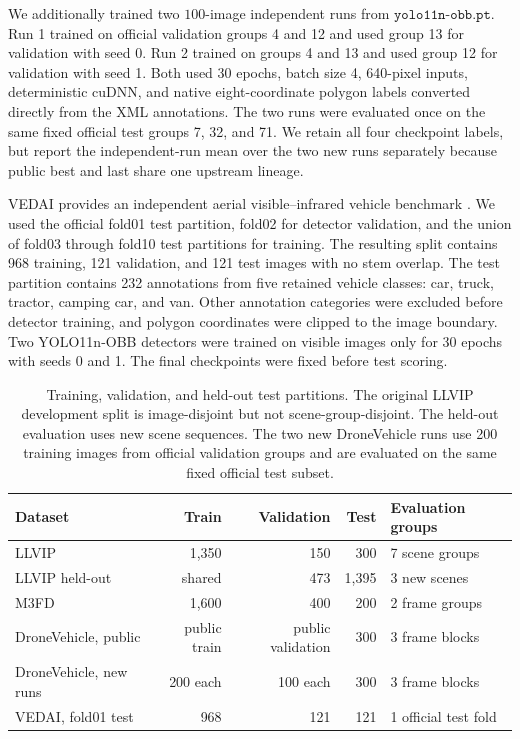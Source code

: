 \documentclass[preprint,11pt]{elsarticle}
\begin{document}
We additionally trained two \(100\)-image independent runs from
\(\texttt{yolo11n-obb.pt}\). Run 1 trained on official validation groups 4 and
12 and used group 13 for validation with seed 0. Run 2 trained on groups 4 and
13 and used group 12 for validation with seed 1. Both used 30 epochs, batch
size 4, 640-pixel inputs, deterministic cuDNN, and native eight-coordinate
polygon labels converted directly from the XML annotations. The two runs were
evaluated once on the same fixed official test groups 7, 32, and 71. We retain
all four checkpoint labels, but report the independent-run mean over the two
new runs separately because public best and last share one upstream lineage.

VEDAI provides an independent aerial visible--infrared vehicle benchmark
\cite{razakarivony2016vedai}. We used the official fold01 test partition,
fold02 for detector validation, and the union of fold03 through fold10 test
partitions for training. The resulting split contains 968 training, 121
validation, and 121 test images with no stem overlap. The test partition
contains 232 annotations from five retained vehicle classes: car, truck,
tractor, camping car, and van. Other annotation categories were excluded
before detector training, and polygon coordinates were clipped to the image
boundary. Two YOLO11n-OBB detectors were trained on visible images only for 30
epochs with seeds 0 and 1. The final checkpoints were fixed before test
scoring.

\begin{table}[t]
\centering
\small
\caption{Training, validation, and held-out test partitions. The original
LLVIP development split is image-disjoint but not scene-group-disjoint. The
held-out evaluation uses new scene sequences. The two new DroneVehicle
runs use 200 training images from official validation groups and are evaluated
on the same fixed official test subset.}
\label{tab:data}
\begin{tabular}{@{}lrrrl@{}}
\toprule
Dataset & Train & Validation & Test & Evaluation groups \\
\midrule
LLVIP & 1,350 & 150 & 300 & 7 scene groups \\
LLVIP held-out & shared & 473 & 1,395 & 3 new scenes \\
M3FD & 1,600 & 400 & 200 & 2 frame groups \\
DroneVehicle, public & public train & public validation & 300 & 3 frame blocks \\
DroneVehicle, new runs & 200 each & 100 each & 300 & 3 frame blocks \\
VEDAI, fold01 test & 968 & 121 & 121 & 1 official test fold \\
\bottomrule
\end{tabular}
\end{table}
\end{document}
